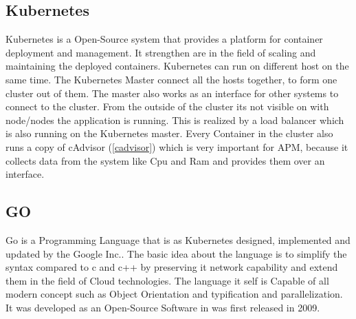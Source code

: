 \subsection{Kubernetes}
Kubernetes is a Open-Source system that provides a platform for container deployment and management. It strengthen are in the field of scaling and maintaining the deployed containers. Kubernetes can run on different host on the same time. The Kubernetes Master connect all the hosts together, to form one cluster out of them. The master also works as an interface for other systems to connect to the cluster. From the outside of the cluster its not visible on with node/nodes the application is running. This is realized by a load balancer which is also running on the Kubernetes master. Every Container in the cluster also runs a copy of cAdvisor (\ref{cadvisor}) which is very important for APM, because it collects data from the system like Cpu and Ram and provides them over an interface.
\subsection{GO}

Go is a Programming Language that is as Kubernetes designed, implemented and updated by the Google Inc.. The basic idea about the language is to simplify the syntax compared to c and c++ by preserving it network capability and extend them in the field of Cloud technologies. The language it self is Capable of all modern concept such as Object Orientation and typification and parallelization. It was developed as an Open-Source Software in was first released in 2009.  



